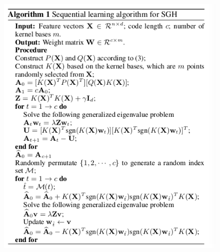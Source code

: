 \documentclass{article}
\begin{document}
\begin{figure}[htbp]%
\centering
\includegraphics[width=0.5\paperwidth]{alg.png}
\label{fig:alg}
\end{figure}
\end{document}
